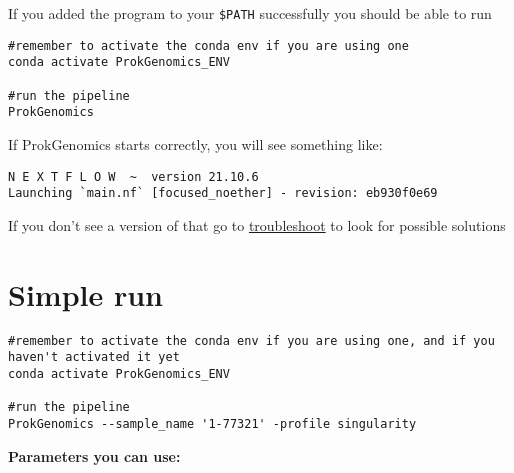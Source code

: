 \documentclass[
]{book}
\begin{document}
If you added the program to your \texttt{\$PATH} successfully you should be able to run

\begin{verbatim}
#remember to activate the conda env if you are using one
conda activate ProkGenomics_ENV

#run the pipeline
ProkGenomics
\end{verbatim}

If ProkGenomics starts correctly, you will see something like:

\begin{verbatim}
N E X T F L O W  ~  version 21.10.6
Launching `main.nf` [focused_noether] - revision: eb930f0e69
\end{verbatim}

If you don't see a version of that go to \href{troubleshooting.html}{troubleshoot} to look for possible solutions

\hypertarget{simple-run}{%
\section{Simple run}\label{simple-run}}

\begin{verbatim}
#remember to activate the conda env if you are using one, and if you haven't activated it yet
conda activate ProkGenomics_ENV

#run the pipeline
ProkGenomics --sample_name '1-77321' -profile singularity
\end{verbatim}

\textbf{Parameters you can use:}
\end{document}

